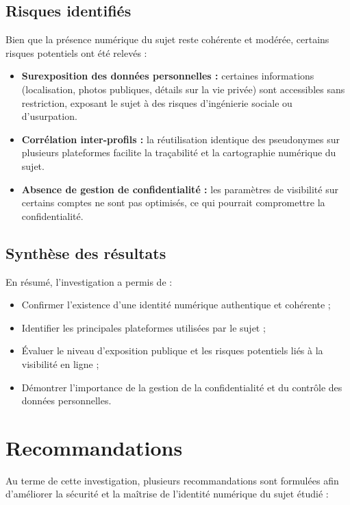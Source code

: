 \documentclass[memoire, 12pt]{report}
\begin{document}
\subsection*{Risques identifiés}
Bien que la présence numérique du sujet reste cohérente et modérée, certains risques potentiels ont été relevés :
\begin{itemize}
    \item \textbf{Surexposition des données personnelles :} certaines informations (localisation, photos publiques, détails sur la vie privée) sont accessibles sans restriction, exposant le sujet à des risques d’ingénierie sociale ou d’usurpation.
    \item \textbf{Corrélation inter-profils :} la réutilisation identique des pseudonymes sur plusieurs plateformes facilite la traçabilité et la cartographie numérique du sujet.
    \item \textbf{Absence de gestion de confidentialité :} les paramètres de visibilité sur certains comptes ne sont pas optimisés, ce qui pourrait compromettre la confidentialité.
\end{itemize}

\subsection*{Synthèse des résultats}
En résumé, l’investigation a permis de :
\begin{itemize}
    \item Confirmer l’existence d’une identité numérique authentique et cohérente ;
    \item Identifier les principales plateformes utilisées par le sujet ;
    \item Évaluer le niveau d’exposition publique et les risques potentiels liés à la visibilité en ligne ;
    \item Démontrer l’importance de la gestion de la confidentialité et du contrôle des données personnelles.
\end{itemize}


\section{Recommandations}
Au terme de cette investigation, plusieurs recommandations sont formulées afin d’améliorer la sécurité et la maîtrise de l’identité numérique du sujet étudié :
\end{document}
